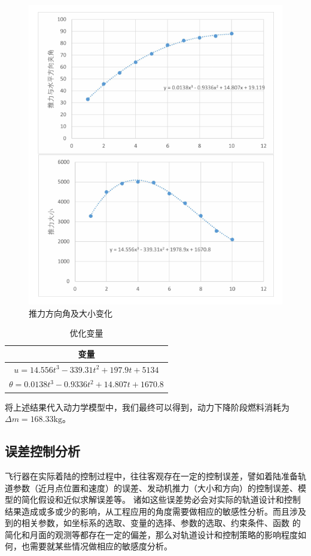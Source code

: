 \documentclass[UTF8,12pt]{ctexart}
\begin{document}
\begin{figure}[htb]
	\centering
	\includegraphics[width=0.6\linewidth]{推力.png}
	\caption{推力方向角及大小变化}
	\label{fig:pathdemo}	
\end{figure}


\begin{table}[ht]
	\centering
	\begin{tabular}{c}  
		\toprule   
		\heiti 变量\\  
		\midrule   
		$u=14.556t^3-339.31t^2+197.9t+5134$\\
		$\theta=0.0138t^3-0.9336t^2+14.807t+1670.8$\\
		\bottomrule  
	\end{tabular}
	\caption{优化变量}
\end{table}

将上述结果代入动力学模型中，我们最终可以得到，动力下降阶段燃料消耗为$\Delta m=168.33\mathrm{kg}$。



\subsection{误差控制分析}

飞行器在实际着陆的控制过程中，往往客观存在一定的控制误差，譬如着陆准备轨道参数（近月点位置和速度）的误差、发动机推力（大小和方向）的控制误差、模型的简化假设和近似求解误差等。 诸如这些误差势必会对实际的轨道设计和控制结果造成或多或少的影响，从工程应用的角度需要做相应的敏感性分析。而且涉及到的相关参数，如坐标系的选取、变量的选择、参数的选取、约束条件、函数 的简化和月面的观测等都存在一定的偏差，那么对轨道设计和控制策略的影响程度如何，也需要就某些情况做相应的敏感度分析。
\end{document}
